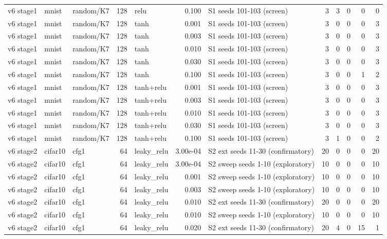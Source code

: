 \begin{table}[htbp]
{\begin{tabular}{@{}lllrlrlrrrrr@{}}
v6 stage1 & mnist & random/K7 & 128 & relu & 0.100 & S1 seeds 101-103 (screen) & 3 & 3 & 0 & 0 & 0 \\
v6 stage1 & mnist & random/K7 & 128 & tanh & 0.001 & S1 seeds 101-103 (screen) & 3 & 0 & 0 & 0 & 3 \\
v6 stage1 & mnist & random/K7 & 128 & tanh & 0.003 & S1 seeds 101-103 (screen) & 3 & 0 & 0 & 0 & 3 \\
v6 stage1 & mnist & random/K7 & 128 & tanh & 0.010 & S1 seeds 101-103 (screen) & 3 & 0 & 0 & 0 & 3 \\
v6 stage1 & mnist & random/K7 & 128 & tanh & 0.030 & S1 seeds 101-103 (screen) & 3 & 0 & 0 & 0 & 3 \\
v6 stage1 & mnist & random/K7 & 128 & tanh & 0.100 & S1 seeds 101-103 (screen) & 3 & 0 & 0 & 1 & 2 \\
v6 stage1 & mnist & random/K7 & 128 & tanh+relu & 0.001 & S1 seeds 101-103 (screen) & 3 & 0 & 0 & 0 & 3 \\
v6 stage1 & mnist & random/K7 & 128 & tanh+relu & 0.003 & S1 seeds 101-103 (screen) & 3 & 0 & 0 & 0 & 3 \\
v6 stage1 & mnist & random/K7 & 128 & tanh+relu & 0.010 & S1 seeds 101-103 (screen) & 3 & 0 & 0 & 0 & 3 \\
v6 stage1 & mnist & random/K7 & 128 & tanh+relu & 0.030 & S1 seeds 101-103 (screen) & 3 & 0 & 0 & 0 & 3 \\
v6 stage1 & mnist & random/K7 & 128 & tanh+relu & 0.100 & S1 seeds 101-103 (screen) & 3 & 1 & 0 & 0 & 2 \\
v6 stage2 & cifar10 & cfg1 & 64 & leaky\_relu & 3.00e-04 & S2 ext seeds 11-30 (confirmatory) & 20 & 0 & 0 & 0 & 20 \\
v6 stage2 & cifar10 & cfg1 & 64 & leaky\_relu & 3.00e-04 & S2 sweep seeds 1-10 (exploratory) & 10 & 0 & 0 & 0 & 10 \\
v6 stage2 & cifar10 & cfg1 & 64 & leaky\_relu & 0.001 & S2 sweep seeds 1-10 (exploratory) & 10 & 0 & 0 & 0 & 10 \\
v6 stage2 & cifar10 & cfg1 & 64 & leaky\_relu & 0.003 & S2 sweep seeds 1-10 (exploratory) & 10 & 0 & 0 & 0 & 10 \\
v6 stage2 & cifar10 & cfg1 & 64 & leaky\_relu & 0.010 & S2 ext seeds 11-30 (confirmatory) & 20 & 0 & 0 & 0 & 20 \\
v6 stage2 & cifar10 & cfg1 & 64 & leaky\_relu & 0.010 & S2 sweep seeds 1-10 (exploratory) & 10 & 0 & 0 & 0 & 10 \\
v6 stage2 & cifar10 & cfg1 & 64 & leaky\_relu & 0.020 & S2 ext seeds 11-30 (confirmatory) & 20 & 4 & 0 & 15 & 1 \\

\end{tabular}}
\end{table}
